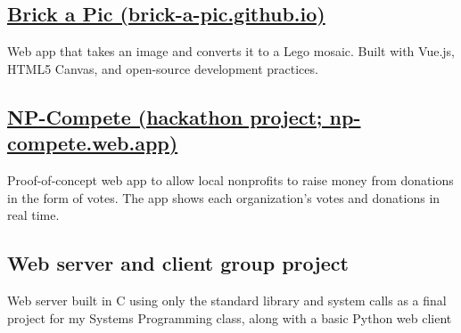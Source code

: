 \documentclass[letterpaper,10pt]{article}
\begin{document}
\begin{minipage}[t]{\dimexpr.67\textwidth-.5\columnsep}
\subsection[Brick a Pic]{\href{https://brick-a-pic.github.io/brick-a-pic}{Brick a Pic (brick-a-pic.github.io)}}
Web app that takes an image and converts it to a Lego mosaic. Built with Vue.js, HTML5 Canvas, and open-source development practices.

\subsection[NP-Compete]{\href{https://np-compete.web.app}{NP-Compete (hackathon project; np-compete.web.app)}}
Proof-of-concept web app to allow local nonprofits to raise money from donations in the form of votes. The app shows each organization's votes and donations in real time.


\subsection{Web server and client group project}
Web server built in C using only the standard library and system calls as a final project for my Systems Programming class, along with a basic Python web client




\end{minipage}
\end{document}
